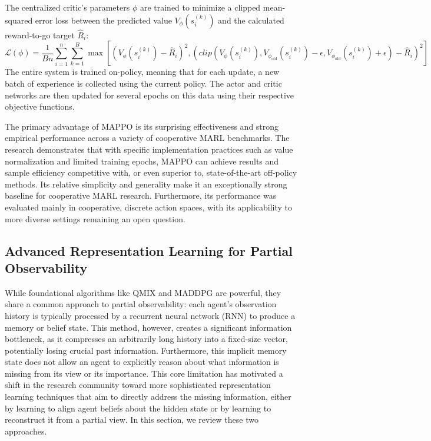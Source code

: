 The centralized critic's parameters $\phi$ are trained to minimize a clipped mean-squared error loss between the predicted value $V_{\phi}(s_i^{(k)})$ and the calculated reward-to-go target $\hat{R}_i$:
\begin{equation}
\label{eq:critic_loss}
\mathcal{L}(\phi) = \frac{1}{Bn} \sum_{i=1}^{n} \sum_{k=1}^{B} \max\left[ (V_{\phi}(s_i^{(k)}) - \hat{R}_i)^2, \left(clip(V_{\phi}(s_i^{(k)}), V_{\phi_{\text{old}}}(s_i^{(k)}) - \epsilon, V_{\phi_{\text{old}}}(s_i^{(k)}) + \epsilon) - \hat{R}_i\right)^2 \right]
\end{equation}
The entire system is trained on-policy, meaning that for each update, a new batch of experience is collected using the current policy. The actor and critic networks are then updated for several epochs on this data using their respective objective functions.


The primary advantage of MAPPO is its surprising effectiveness and strong empirical performance across a variety of cooperative MARL benchmarks. The research demonstrates that with specific implementation practices such as value normalization and limited training epochs, MAPPO can achieve results and sample efficiency competitive with, or even superior to, state-of-the-art off-policy methods. Its relative simplicity and generality make it an exceptionally strong baseline for cooperative MARL research. Furthermore, its performance was evaluated mainly in cooperative, discrete action spaces, with its applicability to more diverse settings remaining an open question.

\subsection{Advanced Representation Learning for Partial Observability}
While foundational algorithms like QMIX and MADDPG are powerful, they share a common approach to partial observability: each agent's observation history is typically processed by a recurrent neural network (RNN) to produce a memory or belief state. This method, however, creates a significant information bottleneck, as it compresses an arbitrarily long history into a fixed-size vector, potentially losing crucial past information. Furthermore, this implicit memory state does not allow an agent to explicitly reason about what information is missing from its view or its importance. This core limitation has motivated a shift in the research community toward more sophisticated representation learning techniques that aim to directly address the missing information, either by learning to align agent beliefs about the hidden state or by learning to reconstruct it from a partial view. In this section, we review these two approaches.


